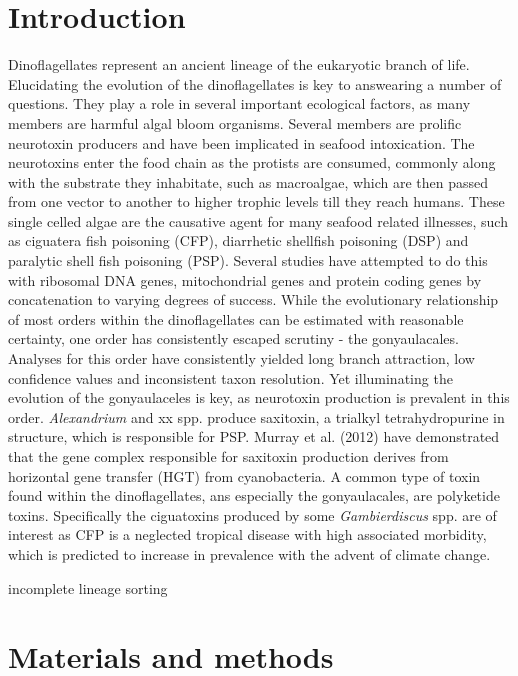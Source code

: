 \documentclass[12pt]{article}
\begin{document}
\section{Introduction}
Dinoflagellates represent an ancient lineage of the eukaryotic branch of life. Elucidating the evolution of the dinoflagellates is key to answearing a number of questions. They play a role in several important ecological factors, as many members are harmful algal bloom organisms. Several members are prolific neurotoxin producers and have been implicated in seafood intoxication. The neurotoxins enter the food chain as the protists are consumed, commonly along with the substrate they inhabitate, such as macroalgae, which are then passed from one vector to another to higher trophic levels till they reach humans. These single celled algae are the causative agent for many seafood related illnesses, such as ciguatera fish poisoning (CFP), diarrhetic shellfish poisoning (DSP) and paralytic shell fish poisoning (PSP).
Several studies have attempted to do this with ribosomal DNA genes, mitochondrial genes and protein coding genes by concatenation to varying degrees of success. While the evolutionary relationship of most orders within the dinoflagellates can be estimated with reasonable certainty, one order has consistently escaped scrutiny - the gonyaulacales. Analyses for this order have consistently yielded long branch attraction, low confidence values and inconsistent taxon resolution. Yet illuminating the evolution of the gonyaulaceles is key, as neurotoxin production is prevalent in this order. 
\emph{Alexandrium} and xx spp. produce saxitoxin, a trialkyl tetrahydropurine in structure, which is responsible for PSP. Murray et al. (2012) have demonstrated that the gene complex responsible for saxitoxin production derives from horizontal gene transfer (HGT) from cyanobacteria.
A common type of toxin found within the dinoflagellates, ans especially the gonyaulacales, are polyketide toxins. Specifically the ciguatoxins produced by some \emph{Gambierdiscus} spp. are of interest as CFP is a neglected tropical disease with high associated morbidity, which is predicted to increase in prevalence with the advent of climate change.

incomplete lineage sorting 
\newpage

\section{Materials and methods}
\end{document}

